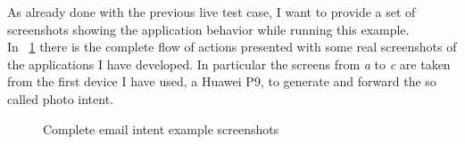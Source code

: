 As already done with the previous live test case, I want to provide a set of screenshots showing the application behavior while running this example.\\
In \figurename~\ref{fig:5.9} there is the complete flow of actions presented with some real screenshots of the applications I have developed. In particular the screens from \textit{a} to \textit{c} are taken from the first device I have used, a Huawei P9, to generate and forward the so called photo intent.\\
\begin{figure}[h!]
	\centering
	\begin{minipage}{.24\textwidth}\centering
	\end{minipage}
	\begin{minipage}{.24\textwidth}\centering
	\end{minipage}
	\centering
	\begin{minipage}{.24\textwidth}\centering
	\end{minipage}
	\begin{minipage}{.24\textwidth}\centering
	\end{minipage}
\end{figure}
\begin{figure}[h!]
	\ContinuedFloat
	\centering
	\begin{minipage}{.24\textwidth}\centering
		\bigskip
	\end{minipage}
	\begin{minipage}{.24\textwidth}\centering
		\bigskip
	\end{minipage}
	\begin{minipage}{.24\textwidth}\centering
		\bigskip
	\end{minipage}
	\begin{minipage}{.24\textwidth}\centering
		\bigskip
	\end{minipage}
	\caption{Complete email intent example screenshots}
	\label{fig:5.9}
\end{figure}\\
